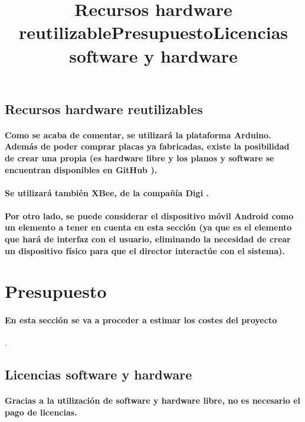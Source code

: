 \subsection{Recursos hardware reutilizables}
\title{Recursos hardware reutilizable}

\paragraph{
Como se acaba de comentar, se utilizará la plataforma Arduino. Además de poder comprar
placas ya fabricadas, existe la posibilidad de crear una propia (es hardware libre y
los planos y software se encuentran disponibles en GitHub \cite{arduinoRepo}).
}

\paragraph{
Se utilizará también XBee, de la compañía Digi \cite{xbeedatasheet}.
}

\paragraph{
Por otro lado, se puede considerar el dispositivo móvil Android como un elemento a
tener en cuenta en esta sección (ya que es el elemento que hará de interfaz con el usuario,
eliminando la necesidad de crear un dispositivo físico para que el director interactúe con
el sistema).
}

\section{Presupuesto}
\title{Presupuesto}

\paragraph{En esta sección se va a proceder a estimar los costes del proyecto}.

\subsection{Licencias software y hardware}
\title{Licencias software y hardware}

\paragraph{
Gracias a la utilización de software y hardware libre, no es necesario el pago de licencias.
}

